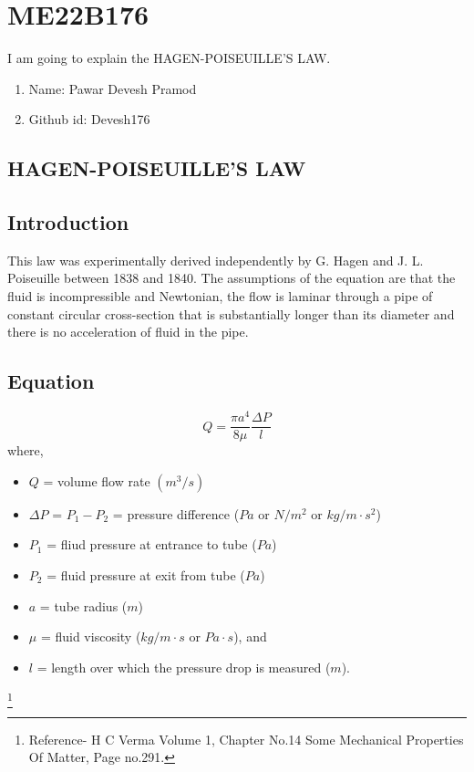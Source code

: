 \section{ME22B176}
I am going to explain the HAGEN-POISEUILLE'S LAW.
\begin{enumerate}
\item Name: Pawar Devesh Pramod
\item Github id: Devesh176
\end{enumerate}
\subsection{HAGEN-POISEUILLE'S LAW}
\subsection{Introduction}
This law was experimentally derived independently by G. Hagen and J. L. Poiseuille between 1838 and 1840. The assumptions of the equation are that the fluid is incompressible and Newtonian, the flow is laminar through a pipe of constant circular cross-section that is substantially longer than its diameter and there is no acceleration of fluid in the pipe.
\subsection{Equation}
\begin{equation}
    Q = \frac{\pi a^{4}}{8\mu} \frac{\Delta P}{l}
\end{equation}
where,
\begin{itemize}
\item $Q$ = volume flow rate $(m^{3}/s)$
\item $\Delta P$ = $P_{1} - P_{2}$ = pressure difference ($Pa$ or $N/m^{2}$ or $kg/m \cdot s^{2}$)
\item $P_{1}$ = fliud pressure at entrance to tube ($Pa$)
\item $P_{2}$ = fluid pressure at exit from tube ($Pa$)
\item $a$ = tube radius ($m$)
\item $\mu$ = fluid viscosity ($kg/m \cdot s$ or $Pa \cdot s$), and
\item $l$ = length over which the pressure drop is measured ($m$).
\end{itemize}
\footnote{Reference- H C Verma Volume 1, Chapter No.14 Some Mechanical Properties Of Matter, Page no.291.}

